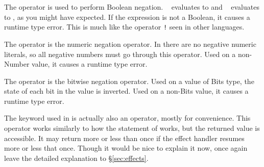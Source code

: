 The  operator is used to perform Boolean negation. \texttt{~}
evaluates to  and \texttt{~} evaluates to , as
you might have expected. If the expression is not a Boolean, it causes a runtime type
error. This is much like the operator \texttt{!} seen in other languages.

\begin{figure}[H]
    \centering
    \parbox[t]{0.4\linewidth}{
        \begin{prooftree}
        \end{prooftree}
    }
    \parbox[t]{0.4\linewidth}{
        \begin{prooftree}
        \end{prooftree}
    }
\end{figure}

The operator \op{-} is the numeric negation operator. In \Trilogy{} there are no
negative numeric literals, so all negative numbers must go through this operator.
Used on a non-Number value, it causes a runtime type error.

\begin{prooftree}
\end{prooftree}

The operator \op{\textasciitilde} is the bitwise negation operator. Used on a value
of Bits type, the state of each bit in the value is inverted.
Used on a non-Bits value, it causes a runtime type error.

\begin{prooftree}
\end{prooftree}

The  keyword used in \Poetry{} is actually also an operator, mostly for
convenience. This operator works similarly to how the  statement of \Prose{}
works, but the returned value is accessible. It may return more or less than once if
the effect handler resumes more or less that once. Though it would be nice to explain
it now, once again leave the detailed explanation to \S\ref{sec:effects}.
